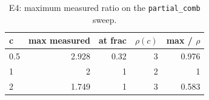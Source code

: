 \begin{table}[t]
\centering
\caption{E4: maximum measured ratio on the \texttt{partial\_comb} sweep.}
\label{tab:e4}
\small
\begin{tabular}{lrrrr}
\hline
c & max measured & at frac & $\rho(c)$ & max / $\rho$ \\
\hline
0.5 & 2.928 & 0.32 & 3 & 0.976 \\
1 & 2 & 1 & 2 & 1 \\
2 & 1.749 & 1 & 3 & 0.583 \\
\hline
\end{tabular}
\end{table}

